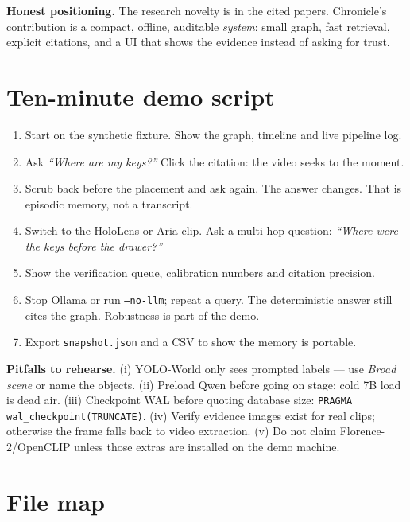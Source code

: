 \documentclass[10pt,a4paper]{article}
\newcommand{\code}[1]{\texttt{\small #1}}
\begin{document}
\textbf{Honest positioning.} The research novelty is in the cited papers. Chronicle's contribution
is a compact, offline, auditable \emph{system}: small graph, fast retrieval, explicit citations,
and a UI that shows the evidence instead of asking for trust.

\section{Ten-minute demo script}

\begin{enumerate}[leftmargin=1.2em,itemsep=2pt,topsep=1pt]
  \item Start on the synthetic fixture. Show the graph, timeline and live pipeline log.
  \item Ask \emph{``Where are my keys?''} Click the citation: the video seeks to the moment.
  \item Scrub back before the placement and ask again. The answer changes. That is episodic
  memory, not a transcript.
  \item Switch to the HoloLens or Aria clip. Ask a multi-hop question:
  \emph{``Where were the keys before the drawer?''}
  \item Show the verification queue, calibration numbers and citation precision.
  \item Stop Ollama or run \code{--no-llm}; repeat a query. The deterministic answer still cites
  the graph. Robustness is part of the demo.
  \item Export \code{snapshot.json} and a CSV to show the memory is portable.
\end{enumerate}

\textbf{Pitfalls to rehearse.}
(i) YOLO-World only sees prompted labels --- use \emph{Broad scene} or name the objects.
(ii) Preload Qwen before going on stage; cold 7B load is dead air.
(iii) Checkpoint WAL before quoting database size: \code{PRAGMA wal\_checkpoint(TRUNCATE)}.
(iv) Verify evidence images exist for real clips; otherwise the frame falls back to video
extraction.
(v) Do not claim Florence-2/OpenCLIP unless those extras are installed on the demo machine.

\appendix
\section{File map}
\end{document}

